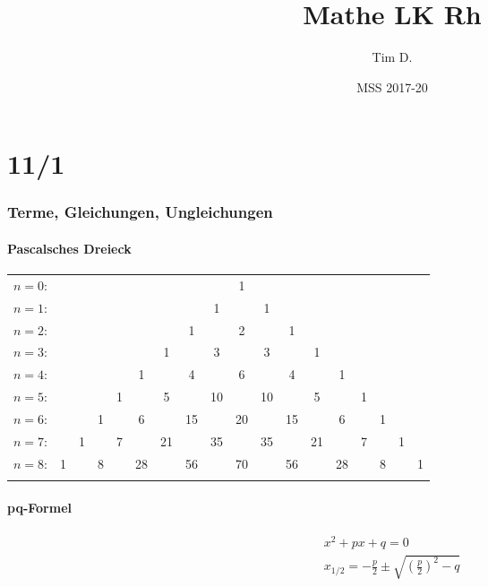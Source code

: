 



\title{Mathe LK Rh}
\author{Tim D.}
\date{MSS 2017-20}
\maketitle

\tableofcontents
\newpage

\part{11/1}

\section{Terme, Gleichungen, Ungleichungen}

\subsection{Pascalsches Dreieck}
\begin{tabular}{rccccccccccccccccc}
  $n=0$:&    &    &    &    &    &    &    &    &  1\\\noalign{\smallskip\smallskip}
  $n=1$:&    &    &    &    &    &    &    &  1 &    &  1\\\noalign{\smallskip\smallskip}
  $n=2$:&    &    &    &    &    &    &  1 &    &  2 &    &  1\\\noalign{\smallskip\smallskip}
  $n=3$:&    &    &    &    &    &  1 &    &  3 &    &  3 &    &  1\\\noalign{\smallskip\smallskip}
  $n=4$:&    &    &    &    &  1 &    &  4 &    &  6 &    &  4 &    &  1\\\noalign{\smallskip\smallskip}
  $n=5$:&    &    &    &  1 &    &  5 &    & 10 &    & 10 &    &  5 &    &  1\\\noalign{\smallskip\smallskip}
  $n=6$:&    &    &  1 &    &  6 &    & 15 &    & 20 &    & 15 &    &  6 &    &  1\\\noalign{\smallskip\smallskip}
  $n=7$:&    &  1 &    &  7 &    & 21 &    & 35 &    & 35 &    & 21 &    &  7 &    &  1\\\noalign{\smallskip\smallskip}
  $n=8$:&  1 &    &  8 &    & 28 &    & 56 &    & 70 &    & 56 &    & 28 &    &  8 &    &  1\\\noalign{\smallskip\smallskip}
\end{tabular}

\subsection{pq-Formel}
\begin{gather*}
  x^2 + px + q = 0 \\
  x_{1/2} = -\frac{p}{2} \pm \sqrt{(\frac{p}{2})^2 - q}
\end{gather*}

